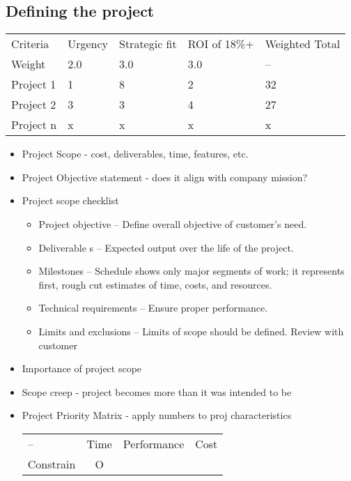 \documentclass[8pt, letter]{extarticle}
\begin{document}
\begin{multicols}{2}
    \subsection{Defining the project}
    \begin{tabular}{ l l l l l }
        Criteria    & Urgency & Strategic fit & ROI of 18\%+ & Weighted Total     \\
        Weight      & 2.0   & 3.0   & 3.0   & --    \\
        Project 1   & 1     & 8     & 2     & 32    \\
        Project 2   & 3     & 3     & 4     & 27    \\
        Project n   & x     & x     & x     & x     \\
    \end{tabular}
    \begin{itemize}
        \item Project Scope - cost, deliverables, time, features, etc.
        \item Project Objective statement - does it align with company mission?
        \item Project scope checklist
            \begin{itemize}
                \item Project objective – Define overall objective of customer's need. 
                \item Deliverable s – Expected output over the life of the project. 
                \item Milestones – Schedule shows only major segments of work; it represents first, rough cut estimates of time, costs, and resources. 
                \item Technical requirements – Ensure proper performance. 
                \item Limits and exclusions – Limits of scope should be defined. Review with customer
            \end{itemize}
        \item Importance of project scope
        \item Scope creep - project becomes more than it was intended to be
        \item Project Priority Matrix - apply numbers to proj characteristics
            \\
            \begin{tabular}{ l c c c }
                --&         Time&Performance& Cost  \\
                Constrain   &   O   &       &       \\

\end{tabular}
\end{itemize}
\end{multicols}
\end{document}
